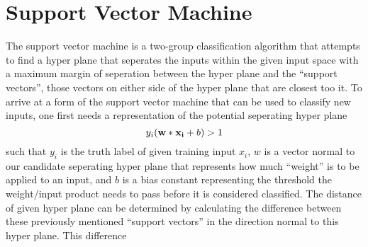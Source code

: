 \section{Support Vector Machine}
The support vector machine is a two-group classification algorithm that attempts to find a hyper
plane that seperates the inputs within the given input space with a maximum margin of seperation
between the hyper plane and the ``support vectors'', those vectors on either side of the hyper plane
that are closest too it. To arrive at a form of the support vector machine that can be used to classify
new inputs, one first needs a representation of the potential seperating hyper plane $$y_i(\bold{w}*\bold{x_i} + b) > 1$$ such that $y_i$ is the truth label of given training input $x_i$, $w$ is a vector normal to our
candidate seperating hyper plane that represents how much ``weight'' is to be applied to an input, and $b$ is a bias constant representing the threshold the weight/input product needs to pass before it is considered
classified. The distance of given hyper plane can be determined by calculating the difference between
these previously mentioned ``support vectors'' in the direction normal to this hyper plane. This difference
